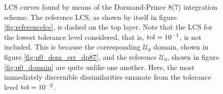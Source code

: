 \begin{figure}[htpb]
    \centering
    
    \caption[LCS curves found by means of the Dormand-Prince 8(7) integration
    scheme]{
        LCS curves found by means of the Dormand-Prince 8(7) integration
        scheme. The reference LCS, as shown by itself in figure
        \ref{fig:referencelcs}, is dashed on the top layer. Note that
        the LCS for the lowest tolerance level considered, that is,
        $\textnormal{tol}=10^{-1}$, is not included. This is because the
        corresponding $\mathcal{U}_{0}$ domain, shown in figure
        \ref{fig:u0_dom_err_dp87}, and the reference $\mathcal{U}_{0}$, shown in figure
        \ref{fig:u0_domain} are quite unlike one another. Here, the most immediately
        discernible dissimilarities emanate from the tolerance level
    $\textnormal{tol}=10^{-2}$.}
    \label{fig:lcs_rkdp87}
\end{figure}
